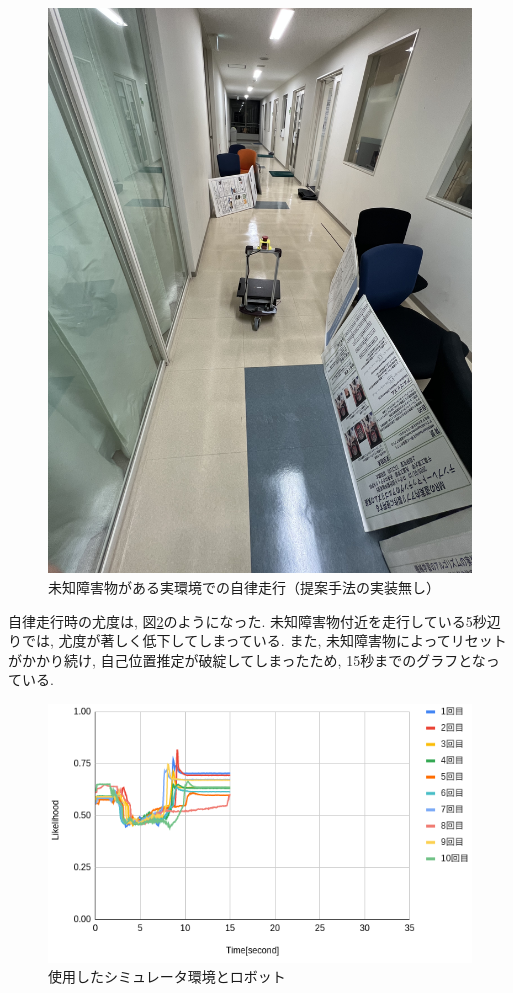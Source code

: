 \begin{figure}[H]
  \begin{center}
    \includegraphics[width=0.5\linewidth]{figs/nav_real_no_imp.jpg}
    \caption{未知障害物がある実環境での自律走行（提案手法の実装無し）}
    \label{fig:nav_no_imp_real}
  \end{center}
\end{figure}

自律走行時の尤度は, 図\ref{fig:nav_likelihood_no_imp_real}のようになった. 
未知障害物付近を走行している5秒辺りでは, 尤度が著しく低下してしまっている. 
また, 未知障害物によってリセットがかかり続け, 自己位置推定が破綻してしまったため, 15秒までのグラフとなっている. 

\begin{figure}[H]
  \begin{center}
    \includegraphics[width=0.98\linewidth]{figs/real_likelihood_before.png}
    \caption{使用したシミュレータ環境とロボット}
    \label{fig:nav_likelihood_no_imp_real}
  \end{center}
\end{figure}

